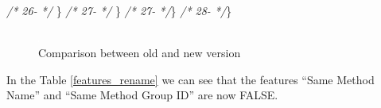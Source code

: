 \documentclass[
]{article}
\newenvironment{Shaded}{\begin{snugshade}}{\end{snugshade}}
\newcommand{\CommentTok}[1]{\textcolor[rgb]{0.56,0.35,0.01}{\textit{#1}}}
\newcommand{\NormalTok}[1]{#1}
\begin{document}
\begin{landscape}
\begin{Shaded}
\begin{Highlighting}[]
\CommentTok{/* 26-                 */}\NormalTok{     \}                                                         }\CommentTok{/* 27-                 */}\NormalTok{     \}                                                         }
\CommentTok{/* 27-                 */}\NormalTok{\}                                                              }\CommentTok{/* 28-                 */}\NormalTok{\}                                                              }
\end{Highlighting}
\end{Shaded}

\normalsize

\begin{figure}
\centering
\includegraphics{figures/fake.png}
\caption{Comparison between old and new version
\label{comparison_rename}}
\end{figure}

\end{landscape}

\newpage

In the Table \ref{features_rename} we can see that the features ``Same
Method Name'' and ``Same Method Group ID'' are now FALSE.

\small
\end{document}
